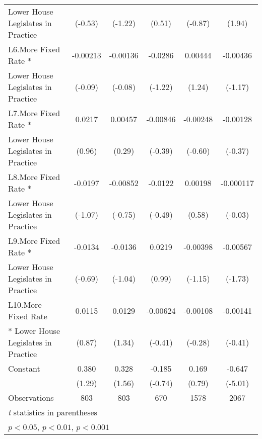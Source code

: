 {\begin{tabular}{l*{5}{c}}
Lower House Legislates in Practice&     (-0.53)         &     (-1.22)         &      (0.51)         &     (-0.87)         &      (1.94)         \\
[1em]
L6.More Fixed Rate *&    -0.00213         &    -0.00136         &     -0.0286         &     0.00444         &    -0.00436         \\
Lower House Legislates in Practice&     (-0.09)         &     (-0.08)         &     (-1.22)         &      (1.24)         &     (-1.17)         \\
[1em]
L7.More Fixed Rate *&      0.0217         &     0.00457         &    -0.00846         &    -0.00248         &    -0.00128         \\
Lower House Legislates in Practice&      (0.96)         &      (0.29)         &     (-0.39)         &     (-0.60)         &     (-0.37)         \\
[1em]
L8.More Fixed Rate *&     -0.0197         &    -0.00852         &     -0.0122         &     0.00198         &   -0.000117         \\
Lower House Legislates in Practice&     (-1.07)         &     (-0.75)         &     (-0.49)         &      (0.58)         &     (-0.03)         \\
[1em]
L9.More Fixed Rate *&     -0.0134         &     -0.0136         &      0.0219         &    -0.00398         &    -0.00567         \\
Lower House Legislates in Practice&     (-0.69)         &     (-1.04)         &      (0.99)         &     (-1.15)         &     (-1.73)         \\
[1em]
L10.More Fixed Rate &      0.0115         &      0.0129         &    -0.00624         &    -0.00108         &    -0.00141         \\
* Lower House Legislates in Practice&      (0.87)         &      (1.34)         &     (-0.41)         &     (-0.28)         &     (-0.41)         \\
[1em]
Constant            &       0.380         &       0.328         &      -0.185         &       0.169         &      -0.647\sym{***}\\
                    &      (1.29)         &      (1.56)         &     (-0.74)         &      (0.79)         &     (-5.01)         \\
\hline
Observations        &         803         &         803         &         670         &        1578         &        2067         \\
\hline\hline
\multicolumn{6}{l}{\footnotesize \textit{t} statistics in parentheses}\\
\multicolumn{6}{l}{\footnotesize \sym{*} \(p<0.05\), \sym{**} \(p<0.01\), \sym{***} \(p<0.001\)}\\
\end{tabular}
}
